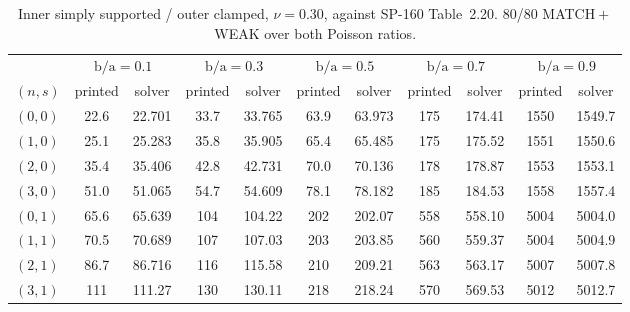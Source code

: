 \documentclass[11pt]{article}
\newcommand{\ba}{\mbox{b/a}}
\begin{document}
\begin{table}[htbp]\centering\footnotesize
\caption{Inner simply supported / outer clamped, $\nu=0.30$, against
SP-160 Table~2.20. 80/80 MATCH${}+{}$WEAK over both Poisson ratios.}
\label{tab:sm-t220-nu30}
\begin{tabular}{lcccccccccc}
\toprule
& \multicolumn{2}{c}{$\ba=0.1$} & \multicolumn{2}{c}{$\ba=0.3$}
& \multicolumn{2}{c}{$\ba=0.5$} & \multicolumn{2}{c}{$\ba=0.7$}
& \multicolumn{2}{c}{$\ba=0.9$}\\
\cmidrule(lr){2-3}\cmidrule(lr){4-5}\cmidrule(lr){6-7}\cmidrule(lr){8-9}\cmidrule(lr){10-11}
$(n,s)$ & printed & solver & printed & solver & printed & solver
& printed & solver & printed & solver\\
\midrule
$(0,0)$ & 22.6 & 22.701 & 33.7 & 33.765 & 63.9 & 63.973 & 175 & 174.41 & 1550 & 1549.7 \\
$(1,0)$ & 25.1 & 25.283 & 35.8 & 35.905 & 65.4 & 65.485 & 175 & 175.52 & 1551 & 1550.6 \\
$(2,0)$ & 35.4 & 35.406 & 42.8 & 42.731 & 70.0 & 70.136 & 178 & 178.87 & 1553 & 1553.1 \\
$(3,0)$ & 51.0 & 51.065 & 54.7 & 54.609 & 78.1 & 78.182 & 185 & 184.53 & 1558 & 1557.4 \\
$(0,1)$ & 65.6 & 65.639 & 104 & 104.22 & 202 & 202.07 & 558 & 558.10 & 5004 & 5004.0 \\
$(1,1)$ & 70.5 & 70.689 & 107 & 107.03 & 203 & 203.85 & 560 & 559.37 & 5004 & 5004.9 \\
$(2,1)$ & 86.7 & 86.716 & 116 & 115.58 & 210 & 209.21 & 563 & 563.17 & 5007 & 5007.8 \\
$(3,1)$ & 111 & 111.27 & 130 & 130.11 & 218 & 218.24 & 570 & 569.53 & 5012 & 5012.7 \\
\bottomrule
\end{tabular}
\end{table}
\end{document}
